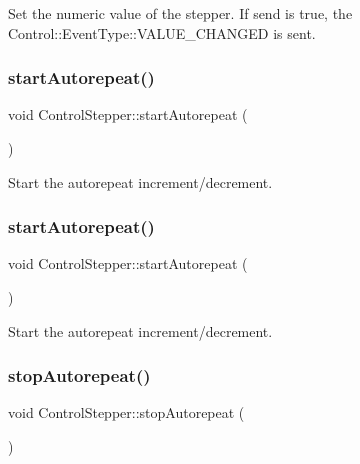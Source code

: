 Set the numeric value of the stepper. If send is true, the Control\+::\+Event\+Type\+::\+V\+A\+L\+U\+E\+\_\+\+C\+H\+A\+N\+G\+ED is sent. \mbox{\label{classControlStepper_ac4d31486530d38b21525418205cfc086}} 
\subsubsection{\texorpdfstring{start\+Autorepeat()}{startAutorepeat()}\hspace{0.1cm}{\footnotesize\ttfamily [1/2]}}
{\footnotesize\ttfamily void Control\+Stepper\+::start\+Autorepeat (\begin{DoxyParamCaption}{ }\end{DoxyParamCaption})}

Start the autorepeat increment/decrement. \mbox{\label{classControlStepper_ac4d31486530d38b21525418205cfc086}} 
\subsubsection{\texorpdfstring{start\+Autorepeat()}{startAutorepeat()}\hspace{0.1cm}{\footnotesize\ttfamily [2/2]}}
{\footnotesize\ttfamily void Control\+Stepper\+::start\+Autorepeat (\begin{DoxyParamCaption}{ }\end{DoxyParamCaption})}

Start the autorepeat increment/decrement. \mbox{\label{classControlStepper_ab7bdf3d5a93aa96f7ba67f2896b2baec}} 
\subsubsection{\texorpdfstring{stop\+Autorepeat()}{stopAutorepeat()}\hspace{0.1cm}{\footnotesize\ttfamily [1/2]}}
{\footnotesize\ttfamily void Control\+Stepper\+::stop\+Autorepeat (\begin{DoxyParamCaption}{ }\end{DoxyParamCaption})}

